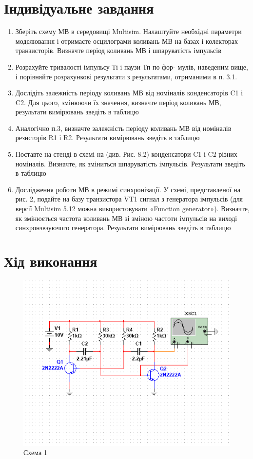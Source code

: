 \documentclass{article}
\begin{document}
\begin{normalsize}
	\section*{Індивідуальне завдання}
	\begin{enumerate}
		\item Зберіть схему МВ в середовищі Multisim. Налаштуйте необхідні параметри моделювання і отримаєте осцилограми коливань МВ на базах і колекторах транзисторів. Визначте період коливань МВ і шпаруватість імпульсів
		\item Розрахуйте тривалості імпульсу Ті і паузи Тп по фор- мулів, наведеним вище, і порівняйте розрахункові результати з результатами, отриманими в п. 3.1.
		\item Дослідіть залежність періоду коливань МВ від номіналів конденсаторів C1 і C2. Для цього, змінюючи їх значення, визначте період коливань МВ, результати вимірювань зведіть в таблицю
		\item Аналогічно п.3, визначте залежність періоду коливань МВ від номіналів резисторів R1 і R2. Результати вимірювань зведіть в таблицю
		\item Поставте на стенді в схемі на (див. Рис. 8.2) конденсатори C1 і C2 різних номіналів. Визначте, як зміниться шпаруватість імпульсів. Результати зведіть в таблицю
		\item Дослідження роботи МВ в режимі синхронізації. У схемі, представленої на рис. 2, подайте на базу транзистора VT1 сигнал з генератора імпульсів (для версії Multisim 5.12 можна використовувати «Function generator»). Визначте, як змінюється частота коливань МВ зі зміною частоти імпульсів на виході синхронзвзуючого генератора. Результати вимірювань зведіть в таблицю
	\end{enumerate}

	\section*{Хід виконання}
	
	\begin{figure}[H]
		\centering
		\includegraphics[width=\textwidth]{1}
		\caption{Схема 1}
	\end{figure}


\end{normalsize}
\end{document}
